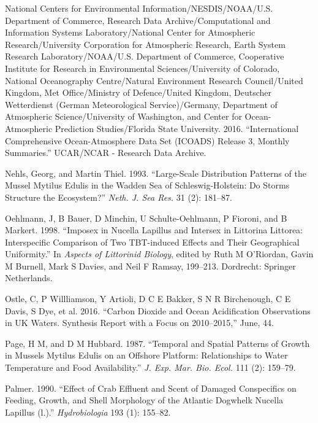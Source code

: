 \documentclass[smallextended]{svjour3}       %
\newlength{\cslhangindent}
\newenvironment{CSLReferences}[2] %
 {%
  \setlength{\parindent}{0pt}
  \ifodd #1 \everypar{\setlength{\hangindent}{\cslhangindent}}\ignorespaces\fi
  \ifnum #2 > 0
  \setlength{\parskip}{#2\baselineskip}
  \fi
 }%
 {}
\begin{document}
\begin{CSLReferences}{1}{0}
\leavevmode{}%
National Centers for Environmental Information/NESDIS/NOAA/U.S.
Department of Commerce, Research Data Archive/Computational and
Information Systems Laboratory/National Center for Atmospheric
Research/University Corporation for Atmospheric Research, Earth System
Research Laboratory/NOAA/U.S. Department of Commerce, Cooperative
Institute for Research in Environmental Sciences/University of Colorado,
National Oceanography Centre/Natural Environment Research Council/United
Kingdom, Met Office/Ministry of Defence/United Kingdom, Deutscher
Wetterdienst (German Meteorological Service)/Germany, Department of
Atmospheric Science/University of Washington, and Center for
Ocean-Atmospheric Prediction Studies/Florida State University. 2016.
{``International Comprehensive {Ocean-Atmosphere} Data Set ({ICOADS})
Release 3, Monthly Summaries.''} UCAR/NCAR - Research Data Archive.

\leavevmode{}%
Nehls, Georg, and Martin Thiel. 1993. {``Large-Scale Distribution
Patterns of the Mussel Mytilus Edulis in the Wadden Sea of
{Schleswig-Holstein}: Do Storms Structure the Ecosystem?''} \emph{Neth.
J. Sea Res.} 31 (2): 181--87.

\leavevmode{}%
Oehlmann, J, B Bauer, D Minchin, U Schulte-Oehlmann, P Fioroni, and B
Markert. 1998. {``Imposex in Nucella Lapillus and Intersex in Littorina
Littorea: Interspecific Comparison of Two {TBT-induced} Effects and
Their Geographical Uniformity.''} In \emph{Aspects of Littorinid
Biology}, edited by Ruth M O'Riordan, Gavin M Burnell, Mark S Davies,
and Neil F Ramsay, 199--213. Dordrecht: Springer Netherlands.

\leavevmode{}%
Ostle, C, P Willliamson, Y Artioli, D C E Bakker, S N R Birchenough, C E
Davis, S Dye, et al. 2016. {``Carbon Dioxide and Ocean Acidification
Observations in {UK} Waters. Synthesis Report with a Focus on
2010--2015,''} June, 44.

\leavevmode{}%
Page, H M, and D M Hubbard. 1987. {``Temporal and Spatial Patterns of
Growth in Mussels Mytilus Edulis on an Offshore Platform: Relationships
to Water Temperature and Food Availability.''} \emph{J. Exp. Mar. Bio.
Ecol.} 111 (2): 159--79.

\leavevmode{}%
Palmer. 1990. {``Effect of Crab Effluent and Scent of Damaged
Conspecifics on Feeding, Growth, and Shell Morphology of the Atlantic
Dogwhelk Nucella Lapillus (l.).''} \emph{Hydrobiologia} 193 (1):
155--82.


\end{CSLReferences}
\end{document}
